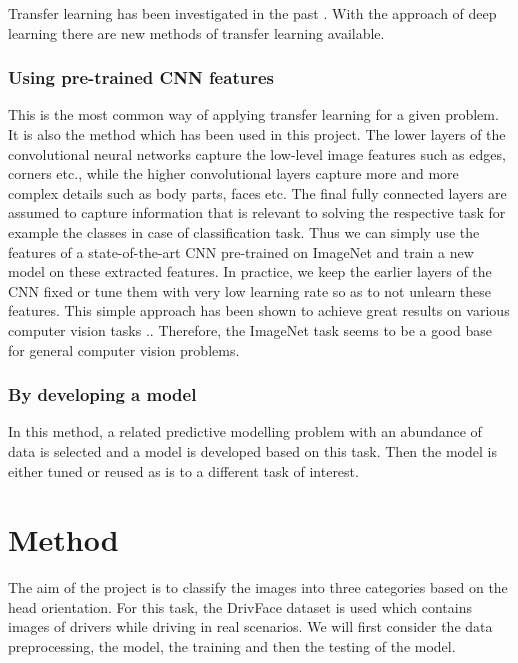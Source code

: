 \documentclass[a4paper, 12pt, oneside, BCOR1cm,toc=chapterentrywithdots]{scrbook}
\begin{document}
Transfer learning has been investigated in the past \cite{noauthor_survey_nodate}. With the approach of deep learning there are new methods of transfer learning available.

\subsection{Using pre-trained CNN features}


This is the most common way of applying transfer learning for a given problem. It is also the method which has been used in this project. The lower layers of the convolutional neural networks capture the low-level image features such as edges, corners etc., while the higher convolutional layers capture more and more complex details such as body parts, faces etc. The final fully connected layers are assumed to capture information that is relevant to solving the respective task for example the classes in case of classification task.
Thus we can simply use the features of a state-of-the-art CNN pre-trained on ImageNet \cite{krizhevsky_imagenet_2012} and train a new model on these extracted features. In practice, we keep the earlier layers of the CNN fixed or tune them with very low learning rate so as to not unlearn these features. This simple approach has been shown to achieve great results on various computer vision tasks \cite{noauthor_survey_nodate}.. Therefore, the ImageNet task seems to be a good base for general computer vision problems. 

\subsection{By developing a model}

In this method, a related predictive modelling problem with an abundance of data is selected and a model is developed based on this task. Then the model is either tuned or reused as is to a different task of interest. 

\chapter{Method}

The aim of the project is to classify the images into three categories based on the head orientation. For this task, the DrivFace dataset \cite{noauthor_uci_nodate} is used which contains images of drivers while driving in real scenarios. We will first consider the data preprocessing, the model, the training and then the testing of the model.
\end{document}
